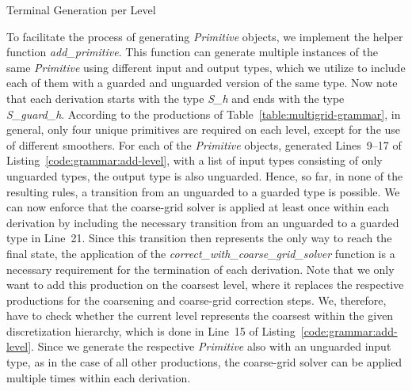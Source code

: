 \begin{listing}
	\inputminted[linenos]{python}{evostencils/grammar/add_terminals.py}
	\caption{Terminal Generation per Level}
	\label{code:grammar:add-terminals}
\end{listing}
To facilitate the process of generating  \emph{Primitive} objects, we implement the helper function \emph{add\_primitive}.
This function can generate multiple instances of the same \emph{Primitive} using different input and output types, which we utilize to include each of them with a guarded and unguarded version of the same type.
Now note that each derivation starts with the type \emph{S\_h} and ends with the type \emph{S\_guard\_h}.
According to the productions of Table~\ref{table:multigrid-grammar}, in general, only four unique primitives are required on each level, except for the use of different smoothers.
For each of the \emph{Primitive} objects, generated Lines~9--17 of Listing~\ref{code:grammar:add-level}, with a list of input types consisting of only unguarded types, the output type is also unguarded.
Hence, so far, in none of the resulting rules, a transition from an unguarded to a guarded type is possible.
We can now enforce that the coarse-grid solver is applied at least once within each derivation by including the necessary transition from an unguarded to a guarded type in Line~21.
Since this transition then represents the only way to reach the final state, the application of the \emph{correct\_with\_coarse\_grid\_solver} function is a necessary requirement for the termination of each derivation.
Note that we only want to add this production on the coarsest level, where it replaces the respective productions for the coarsening and coarse-grid correction steps.
We, therefore, have to check whether the current level represents the coarsest within the given discretization hierarchy, which is done in Line~15 of Listing~\ref{code:grammar:add-level}.
Since we generate the respective \emph{Primitive} also with an unguarded input type, as in the case of all other productions, the coarse-grid solver can be applied multiple times within each derivation.

